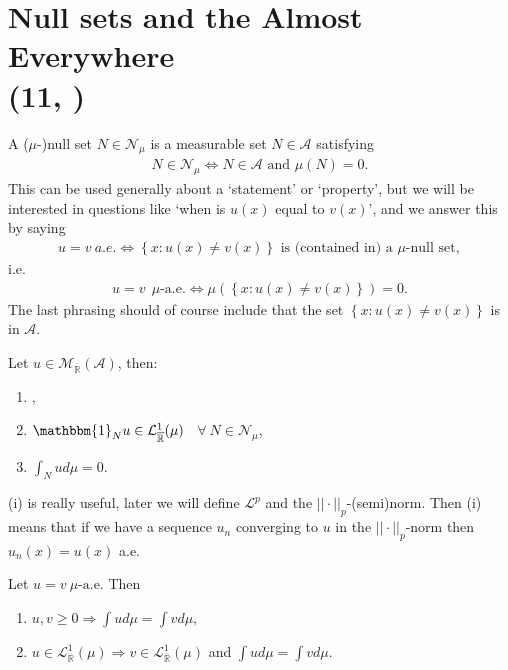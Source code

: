 \section{Null sets and the Almost Everywhere \protect\\ \tiny{(11, \cite{schilling2017measures})}}
\begin{definition}
    A (\(\mu\)-)null set \(N\in\mathcal{N}_{\mu}\) is a measurable set \(N\in\mathscr{A}\) satisfying
    \begin{align*}
        N\in\mathcal{N}_{\mu} \Longleftrightarrow N\in\mathscr{A} \text{ and } \mu(N) = 0.
    \end{align*}
    This can be used generally about a `statement' or `property', but we will be interested in questions like 
    `when is \(u(x)\) equal to \(v(x)\)', and we answer this by saying
    \begin{align*}
        u=v \ a.e. \Leftrightarrow \left\{ x: u(x) \neq v(x) \right\} \text{ is (contained in) a }\mu\text{-null set}, 
    \end{align*}
    i.e.
    \begin{align*}
        u=v \ \  \mu\text{-a.e.} \Leftrightarrow \mu\left( \left\{ x: u(x) \neq v(x) \right\} \right) = 0.
    \end{align*}
    The last phrasing should of course include that the set \( \left\{ x: u(x) \neq v(x) \right\}\) is in \(\mathscr{A}\).
\end{definition}
\begin{theorem} \label{th:11.2}
    Let \(u\in \mathcal{M}_{\overline{\mathbb{R}}}(\mathscr{A})\), then:
    \begin{enumerate}[label=(\roman*)]
        \item {},
        \item \(\mathbbm{1}_{N}u\in \mathcal{L}^{1}_{\overline{\mathbb{R}}}(\mu)\) \ \(\forall \ N\in\mathcal{N}_{\mu}\),
        \item \(\int_Nud\mu = 0\).
    \end{enumerate}
    (i) is really useful, later we will define \(\mathcal{L}^p\) and the \(||\cdot||_p\)-(semi)norm. Then (i) means that if we have a
    sequence \(u_n\) converging to \(u\) in the \(||\cdot ||_p\)-norm then \(u_n(x) = u(x)\) a.e.
\end{theorem}
\begin{corollary}
    Let \(u=v \ \mu \text{-a.e.}\) Then
    \begin{enumerate}[label=(\roman*)]
        \item \(u,v \geq 0 \Rightarrow \int ud\mu = \int vd\mu\),
        \item \(u\in\mathcal{L}^{1}_{\overline{\mathbb{R}}}(\mu) \Rightarrow v\in\mathcal{L}^{1}_{\overline{\mathbb{R}}}(\mu)\) and \(\int ud\mu = \int vd\mu\).
    \end{enumerate}
\end{corollary}
